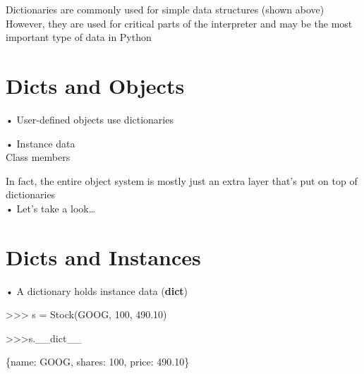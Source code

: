 \documentclass[
  letterpaper,
  DIV=11,
  numbers=noendperiod]{scrreprt}
\newenvironment{Shaded}{\begin{snugshade}}{\end{snugshade}}
\newcommand{\NormalTok}[1]{\textcolor[rgb]{0.00,0.23,0.31}{#1}}
\begin{document}
Dictionaries are commonly used for simple data structures (shown
above)\\
However, they are used for critical parts of the interpreter and may be
the most important type of data in Python


\chapter{Dicts and Objects}\label{dicts-and-objects}

• User-defined objects use dictionaries

• Instance data\\
Class members

In fact, the entire object system is mostly just an extra layer that's
put on top of dictionaries\\
• Let's take a look\ldots{}


\chapter{Dicts and Instances}\label{dicts-and-instances}

• A dictionary holds instance data (\textbf{dict})

\begin{Shaded}
\begin{Highlighting}[]
\NormalTok{\textgreater{}\textgreater{}\textgreater{} s = Stock(\textquotesingle{}GOOG\textquotesingle{}, 100, 490.10) }
\end{Highlighting}
\end{Shaded}

\begin{Shaded}
\begin{Highlighting}[]
\NormalTok{\textgreater{}\textgreater{}\textgreater{}s.\_\_dict\_\_ }
\end{Highlighting}
\end{Shaded}

\begin{Shaded}
\begin{Highlighting}[]
\NormalTok{\{\textquotesingle{}name\textquotesingle{}: \textquotesingle{}GOOG\textquotesingle{}, \textquotesingle{}shares\textquotesingle{}: 100, \textquotesingle{}price\textquotesingle{}: 490.10\} }
\end{Highlighting}
\end{Shaded}
\end{document}
